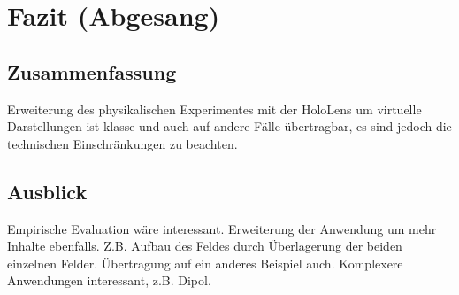 \section{Fazit (Abgesang)}
\label{sec-7}

\subsection{Zusammenfassung}
Erweiterung des physikalischen Experimentes mit der HoloLens um virtuelle Darstellungen ist klasse und auch auf andere Fälle übertragbar, es sind jedoch die technischen Einschränkungen zu beachten.

\subsection{Ausblick}
Empirische Evaluation wäre interessant. Erweiterung der Anwendung um mehr Inhalte ebenfalls. Z.B. Aufbau des Feldes durch Überlagerung der beiden einzelnen Felder. Übertragung auf ein anderes Beispiel auch. Komplexere Anwendungen interessant, z.B. Dipol.